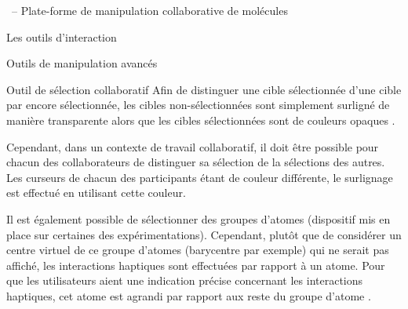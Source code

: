 \documentclass[myfrancais,ngerman,english,frenchb]{mythesis}
\begin{document}
\begin{mychapter}{\myShaddock\ -- Plate-forme de manipulation collaborative de molécules}
\begin{mysection}{Les outils d'interaction}
\begin{mysubsection}{Outils de manipulation avancés}
\begin{mysubsubsection}{Outil de sélection collaboratif}
					Afin de distinguer une cible sélectionnée d'une cible par encore sélectionnée, les cibles non-sélectionnées sont simplement surligné de manière transparente alors que les cibles sélectionnées sont de couleurs opaques .

					Cependant, dans un contexte de travail collaboratif, il doit être possible pour chacun des collaborateurs de distinguer sa sélection de la sélections des autres.
					Les curseurs de chacun des participants étant de couleur différente, le surlignage est effectué en utilisant cette couleur.

					Il est également possible de sélectionner des groupes d'atomes (dispositif mis en place sur certaines des expérimentations).
					Cependant, plutôt que de considérer un centre virtuel de ce groupe d'atomes (barycentre par exemple) qui ne serait pas affiché, les interactions haptiques sont effectuées par rapport à un atome.
					Pour que les utilisateurs aient une indication précise concernant les interactions haptiques, cet atome est agrandi par rapport aux reste du groupe d'atome .


\end{mysubsubsection}
\end{mysubsection}
\end{mysection}
\end{mychapter}
\end{document}
